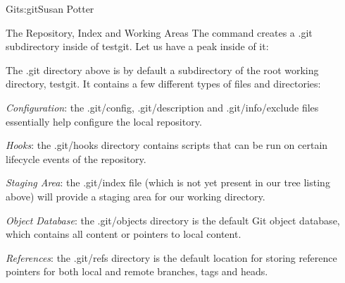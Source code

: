 \begin{aosachapter}{Git}{s:git}{Susan Potter}
\begin{aosasect1}{The Repository, Index and Working Areas}
The  command creates a .git subdirectory inside of testgit.
Let us have a peak inside of it:
\begin{aosaitemize}
  \item {}\newline
\end{aosaitemize}

The .git directory above is by default a subdirectory of the root working
directory, testgit. It contains a few different types of files and
directories:

\begin{aosaitemize}
  \item \emph{Configuration}: the .git/config, .git/description and
  .git/info/exclude files essentially help configure the local repository.
  \item \emph{Hooks}: the .git/hooks directory contains scripts that can
  be run on certain lifecycle events of the repository.
  \item \emph{Staging Area}: the .git/index file (which is not yet
  present in our tree listing above) will provide a staging area for our
  working directory.
  \item \emph{Object Database}: the .git/objects directory is the default
  Git object database, which contains all content or pointers to local
  content.
  \item \emph{References}: the .git/refs directory is the default location
  for storing reference pointers for both local and remote branches, tags and
  heads.
\end{aosaitemize}


\end{aosasect1}
\end{aosachapter}
